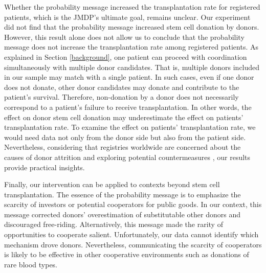 \documentclass[12pt, a4paper]{article}
\begin{document}
Whether the probability message increased the transplantation rate for registered patients, which is the JMDP's ultimate goal, remains unclear. Our experiment did not find that the probability message increased stem cell donation by donors. However, this result alone does not allow us to conclude that the probability message does not increase the transplantation rate among registered patients. As explained in Section \ref{background}, one patient can proceed with coordination simultaneously with multiple donor candidates. That is, multiple donors included in our sample may match with a single patient. In such cases, even if one donor does not donate, other donor candidates may donate and contribute to the patient's survival. Therefore, non-donation by a donor does not necessarily correspond to a patient's failure to receive transplantation. In other words, the effect on donor stem cell donation may underestimate the effect on patients' transplantation rate. To examine the effect on patients' transplantation rate, we would need data not only from the donor side but also from the patient side. Nevertheless, considering that registries worldwide are concerned about the causes of donor attrition and exploring potential countermeasures \citep[for example,][]{Switzer2018, Balassa2019, Hamed2023, Haylock2024}, our results provide practical insights.

Finally, our intervention can be applied to contexts beyond stem cell transplantation. The essence of the probability message is to emphasize the scarcity of investors or potential cooperators for public goods. In our context, this message corrected donors' overestimation of substitutable other donors and discouraged free-riding. Alternatively, this message made the rarity of opportunities to cooperate salient. Unfortunately, our data cannot identify which mechanism drove donors. Nevertheless, communicating the scarcity of cooperators is likely to be effective in other cooperative environments such as donations of rare blood types.
\end{document}

